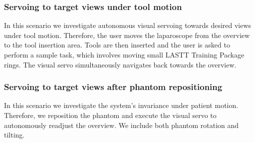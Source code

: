 \subsubsection{Servoing to target views under tool motion}
\label{c2:sec:clin_protocol_tool}
In this scenario we investigate autonomous visual servoing towards desired views under tool motion. Therefore, the user moves the laparoscope from the overview to the tool insertion area. Tools are then inserted and the user is asked to perform a sample task, which involves moving small LASTT Training Package rings. The visual servo simultaneously navigates back towards the overview.

\subsubsection{Servoing to target views after phantom repositioning}
\label{c2:sec:clin_protocol_re}
In this scenario we investigate the system's invariance under patient motion. Therefore, we reposition the phantom and execute the visual servo to autonomously readjust the overview. We include both phantom rotation and tilting.

